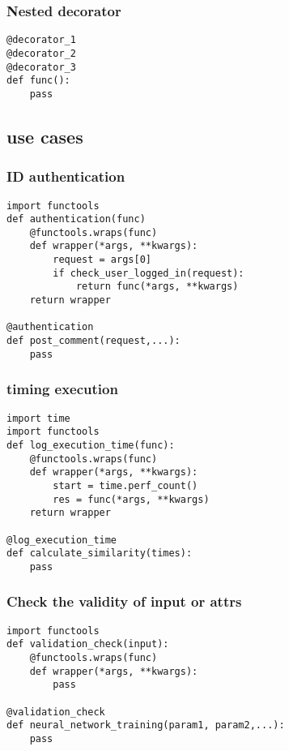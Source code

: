 \documentclass[11pt]{article}
\begin{document}
\subsubsection{Nested decorator}
\label{sec:org7b584a2}
\begin{verbatim}
@decorator_1
@decorator_2
@decorator_3
def func():
    pass 
\end{verbatim}

\subsection{use cases}
\label{sec:orgf113963}

\subsubsection{ID authentication}
\label{sec:org6e1ea5c}
\begin{verbatim}
import functools
def authentication(func)
    @functools.wraps(func)
    def wrapper(*args, **kwargs):
        request = args[0]
        if check_user_logged_in(request):
            return func(*args, **kwargs)
    return wrapper

@authentication
def post_comment(request,...):
    pass 
\end{verbatim}

\subsubsection{timing execution}
\label{sec:org39ee009}
\begin{verbatim}
import time
import functools
def log_execution_time(func):
    @functools.wraps(func)
    def wrapper(*args, **kwargs):
        start = time.perf_count()
        res = func(*args, **kwargs)
    return wrapper

@log_execution_time
def calculate_similarity(times):
    pass 
\end{verbatim}

\subsubsection{Check the validity of input or attrs}
\label{sec:org4bccfdc}
\begin{verbatim}
import functools
def validation_check(input):
    @functools.wraps(func)
    def wrapper(*args, **kwargs):
        pass

@validation_check
def neural_network_training(param1, param2,...):
    pass 
\end{verbatim}
\end{document}
